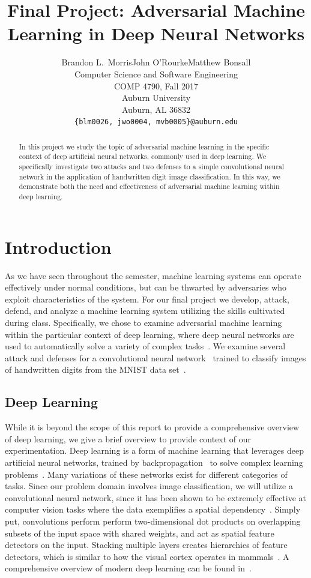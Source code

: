 \documentclass{article}
\title{Final Project: Adversarial Machine Learning in Deep Neural Networks}
\author{Brandon L.~Morris\qquad John O'Rourke\qquad Matthew Bonsall\\
  Computer Science and Software Engineering\\
  COMP 4790, Fall 2017\\
  Auburn University\\
  Auburn, AL 36832\\
  \texttt{\{blm0026, jwo0004, mvb0005\}@auburn.edu}}
\begin{document}
\maketitle


\begin{abstract}
In this project we study the topic of adversarial machine learning in the
specific context of deep artificial neural networks, commonly used in deep
learning. We specifically investigate two attacks and two defenses to a simple
convolutional neural network in the application of handwritten digit image
classification. In this way, we demonstrate both the need and effectiveness of
adversarial machine learning within deep learning.
\end{abstract}

\section{Introduction}

As we have seen throughout the semester, machine learning systems can operate
effectively under normal conditions, but can be thwarted by adversaries who
exploit characteristics of the system. For our final project we develop, attack,
defend, and analyze a machine learning system utilizing the skills cultivated
during class. Specifically, we chose to examine adversarial machine learning
within the particular context of deep learning, where deep neural networks are
used to automatically solve a variety of complex tasks~\cite{lecun2015deep}.
We examine several attack and defenses for a convolutional neural
network~\cite{goodfellow2016deep} trained to classify images of handwritten
digits from the MNIST data set~\cite{lecun1998mnist}.

\subsection{Deep Learning}

While it is beyond the scope of this report to provide a comprehensive overview
of deep learning, we give a brief overview to provide context of our
experimentation. Deep learning is a form of machine learning that leverages deep
artificial neural networks, trained by backpropagation~\cite{le1988theoretical}
to solve complex learning problems~\cite{goodfellow2016deep}. Many variations of
these networks exist for different categories of tasks. Since our problem domain
involves image classification, we will utilize a convolutional neural network,
since it has been shown to be extremely effective at computer vision tasks where
the data exemplifies a spatial dependency~\cite{krizhevsky2012imagenet}. Simply
put, convolutions perform perform two-dimensional dot products on overlapping
subsets of the input space with shared weights, and act as spatial feature
detectors on the input. Stacking multiple layers creates hierarchies of feature
detectors, which is similar to how the visual cortex operates in
mammals~\cite{hubel1962receptive}. A comprehensive overview of modern deep
learning can be found in~\cite{goodfellow2016deep}.
\end{document}
